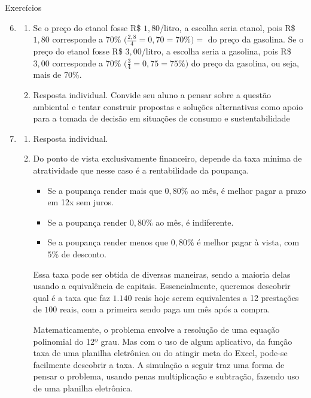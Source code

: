   \begin{answer}{Exercícios}
  { 
  \exerciselist
  \begin{enumerate}
    \setcounter{enumi}{5}
      \item
  \begin{enumerate}
    \item Se o preço do etanol fosse R\$ $1{,}80$/litro, a escolha seria etanol, pois R\$ $1{,}80$ corresponde a $70$\% $\big(\frac{2{,}8}{4}=0{,}70=70\%\big)=$ do preço da gasolina. Se o preço do etanol fosse R\$ $3{,}00$/litro, a escolha seria a gasolina, pois R\$ $3{,}00$ corresponde a $70\%$ $\big(\frac{3}{4}=0{,}75=75\%\big)$ do preço da gasolina, ou seja, mais de $70\%$.
    \item Resposta individual. Convide seu aluno a pensar sobre a questão ambiental e tentar construir propostas e soluções alternativas como apoio para a tomada de decisão em situações de consumo e sustentabilidade
  \end{enumerate}

      \item 
  \begin{enumerate}
    \item Resposta individual.
    \item Do ponto de vista exclusivamente financeiro, depende da taxa mínima de atratividade que nesse caso é a rentabilidade da poupança.
    \begin{itemize}
    \item Se a poupança render mais que $0,80\%$ ao mês, é melhor pagar a prazo em 12x sem juros.
    \item Se a poupança render $0,80\%$ ao mês, é indiferente.
    \item Se a poupança render menos que $0,80\%$ é melhor pagar à vista, com $5\%$ de desconto.
    \end{itemize}

    Essa taxa pode ser obtida de diversas maneiras, sendo a maioria delas usando a equivalência de capitais. Essencialmente, queremos descobrir qual é a taxa que faz $1.140$ reais hoje serem equivalentes a 12 prestações de $100$ reais, com a primeira sendo paga um mês após a compra. 

    Matematicamente, o problema envolve a resolução de uma equação polinomial do 12º grau. Mas com o uso de algum aplicativo, da função taxa de uma planilha eletrônica ou do atingir meta do Excel, pode-se facilmente descobrir a taxa. A simulação a seguir traz uma forma de pensar o problema, usando penas multiplicação e subtração, fazendo uso de uma planilha eletrônica.


\end{enumerate}
\end{enumerate}}
\end{answer}

